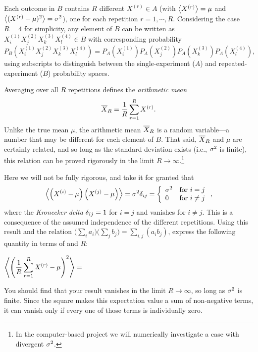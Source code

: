 Each outcome in $B$ contains $R$ different $X^{(r)} \in A$ (with $\left\langle X^{(r)} \right\rangle = \mu$ and $\left\langle (X^{(r)} - \mu)^2 \right\rangle = \sigma^2$), one for each repetition $r = 1, \cdots, R$.
Considering the case $R = 4$ for simplicity, any element of $B$ can be written as $X_i^{(1)} X_j^{(2)} X_k^{(3)} X_l^{(4)} \in B$ with corresponding probability
\begin{equation*}
  P_B\left(X_i^{(1)} X_j^{(2)} X_k^{(3)} X_l^{(4)}\right) = P_A\left(X_i^{(1)}\right) P_A\left(X_j^{(2)}\right) P_A\left(X_k^{(3)}\right) P_A\left(X_l^{(4)}\right),
\end{equation*}
using subscripts to distinguish between the single-experiment ($A$) and repeated-experiment ($B$) probability spaces.

Averaging over all $R$ repetitions defines the \textit{arithmetic mean}
\begin{equation}
  \label{eq:ave}
  \overline X_R = \frac{1}{R} \sum_{r = 1}^R X^{(r)}.
\end{equation}
Unlike the true mean $\mu$, the arithmetic mean $\overline X_R$ is a random variable---a number that may be different for each element of $B$.
That said, $\overline X_R$ and $\mu$ are certainly related, and so long as the standard deviation exists (i.e., $\sigma^2$ is finite), this relation can be proved rigorously in the limit $R \to \infty$.\footnote{In the computer-based project we will numerically investigate a case with divergent $\sigma^2$.}

Here we will not be fully rigorous, and take it for granted that
\begin{equation*}
  \left\langle \left(X^{(i)} - \mu\right)\left(X^{(j)} - \mu\right) \right\rangle = \sigma^2 \delta_{ij} = \left\{\begin{array}{ll}\sigma^2 & \mbox{for } i = j \\ 0 & \mbox{for } i \ne j\end{array}\right.,
\end{equation*}
where the \textit{Kronecker delta} $\delta_{ij} = 1$ for $i = j$ and vanishes for $i \ne j$.
This is a consequence of the assumed independence of the different repetitions.
Using this result and the relation $\big(\sum_i a_i\big)\big(\sum_j b_j\big) = \sum_{i, j} \left(a_i b_j\right)$, express the following quantity in terms of \si and $R$:
\begin{mdframed}
  $\displaystyle \left\langle \left(\frac{1}{R} \sum_{r = 1}^R X^{(r)} - \mu\right)^2 \right\rangle = $ \\[100 pt]
\end{mdframed}
You should find that your result vanishes in the limit $R \to \infty$, so long as $\sigma^2$ is finite.
Since the square makes this expectation value a sum of non-negative terms, it can vanish only if every one of those terms is individually zero.

